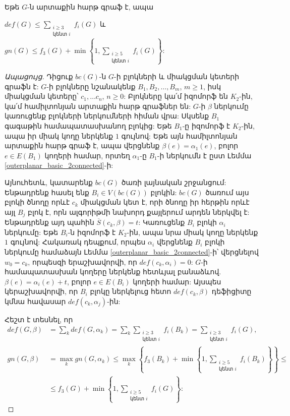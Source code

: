 \begin{theorem}
\label{outerplanar_basic}
Եթե $G$-ն արտաքին հարթ գրաֆ է, ապա 
\begin{center}
$def(G) \leq \sum\limits_{\substack{i\geq 3 \\ \text{կենտ }i}}{f_i(G)}$ և $gn(G) \leq f_3(G) + \min\left\{1, \sum\limits_{\substack{i\geq 5 \\ \text{կենտ }i}}{f_{i}(G)}\right\}$:
\end{center}
\end{theorem}
\begin{proof}[Ապացույց]
Դիցուք $bc(G)$-ն $G$-ի բլոկների և միակցման կետերի գրաֆն է: $G$-ի բլոկները նշանակենք $B_1, B_2, \ldots, B_m$, $m\geq 1$, իսկ միակցման կետերը՝ $c_1, \ldots c_n$, $n \geq 0$: Բլոկները կա՛մ իզոմորֆ են $K_2$-ին, կա՛մ համիլտոնյան արտաքին հարթ գրաֆներ են: $G$-ի $\beta$ ներկումը կառուցենք բլոկների ներկումների հիման վրա: Սկսենք $B_1$ գագաթին համապատասխանող բլոկից: Եթե $B_1$-ը իզոմորֆ է $K_2$-ին, ապա իր միակ կողը ներկենք $1$ գույնով: Եթե այն համիլտոնյան արտաքին հարթ գրաֆ է, ապա վերցնենք $\beta(e) = \alpha_1(e)$, բոլոր $e \in E(B_1)$ կողերի համար, որտեղ $\alpha_1$-ը $B_1$-ի ներկումն է ըստ Լեմմա \ref{outerplanar_basic_2connected}-ի:

Այնուհետև, կատարենք $bc(G)$ ծառի լայնական շրջանցում: Ենթադրենք հասել ենք $B_i \in V(bc(G))$ բլոկին: $bc(G)$ ծառում այս բլոկի ծնողը որևէ $c_k$ միակցման կետ է, որի ծնողը իր հերթին որևէ այլ $B_j$ բլոկ է, որն ալգորիթմի նախորդ քայլերում արդեն ներկվել է: Ենթադրենք այդ պահին $\overline{S}(c_k, \beta) = t$: Կառուցենք $B_i$ բլոկի $\alpha_i$ ներկումը: Եթե $B_i$-ն իզոմորֆ է $K_2$-ին, ապա նրա միակ կողը ներկենք $1$ գույնով: Հակառակ դեպքում, որպես $\alpha_i$ վերցնենք $B_i$ բլոկի ներկումը համաձայն Լեմմա \ref{outerplanar_basic_2connected}-ի՝ վերցնելով $w_0 = c_k$, որպեսզի երաշխավորվի, որ $def(c_k,\alpha_i) = 0$: $G$-ի համապատասխան կողերը ներկենք հետևյալ բանաձևով. $\beta(e) = \alpha_i(e) + t$, բոլոր $e \in E(B_i)$ կողերի համար: Այսպես կերաշխավորվի, որ $B_i$ բլոկը ներկելուց հետո $def(c_k, \beta)$ դեֆիցիտը կմնա հավասար $def(c_k, \alpha_j)$-ին:

Հեշտ է տեսնել, որ
\begin{align*}
def(G,\beta) &= \sum\limits_{k}{def(G,\alpha_k)} =  \sum\limits_{k}{ \sum\limits_{\substack{i\geq 3 \\ \text{կենտ }i}}{f_i(B_k)} } = \sum\limits_{\substack{i\geq 3 \\ \text{կենտ }i}}{f_i(G)},\\
gn(G,\beta) &= \max\limits_{k}{gn(G,\alpha_k)} \leq \max\limits_{k}{\left\{f_3(B_k) + \min\left\{1, \sum\limits_{\substack{i\geq 5 \\ \text{կենտ }i}}{f_{i}(B_k)}\right\}\right\}} \leq \\
&\leq f_3(G) + \min\left\{1, \sum\limits_{\substack{i\geq 5 \\ \text{կենտ }i}}{f_{i}(G)}\right\}:
\end{align*}
\end{proof}

